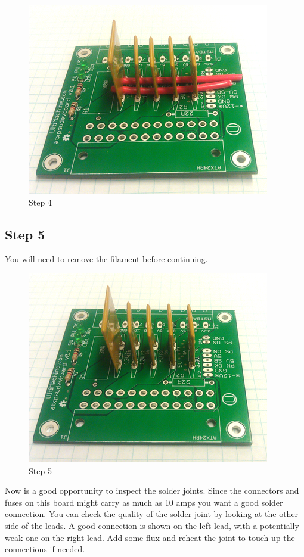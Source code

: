 \begin{figure}[H]
\centering
\includegraphics{./png/step-04.png}
\caption{Step 4}
\end{figure}

\subsection{Step 5}

You will need to remove the filament before continuing.

\begin{figure}[H]
\centering
\includegraphics{./png/step-05.png}
\caption{Step 5}
\end{figure}

Now is a good opportunity to inspect the solder joints. Since the
connectors and fuses on this board might carry as much as 10 amps you
want a good solder connection. You can check the quality of the solder
joint by looking at the other side of the leads. A good connection is
shown on the left lead, with a potentially weak one on the right lead.
Add some
\href{http://en.wikipedia.org/wiki/Flux_\%28metallurgy\%29}{flux} and
reheat the joint to touch-up the connections if needed.

